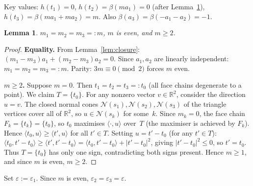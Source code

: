 \documentclass{article}
\newtheorem{lemma}{Lemma}
\begin{document}
Key values:
$h(t_1)=0$, $h(t_2)=\beta(m a_1)=0$ (after Lemma~\ref{lem:n3m}),
$h(t_3)=\beta(ma_1+ma_2)=m$.
Also $\beta(a_3)=\beta(-a_1-a_2)=-1$.

\begin{lemma}\label{lem:n3m}
$m_1=m_2=m_3=:m$, $m$ is even, and $m\ge 2$.
\end{lemma}
\begin{proof}
\textbf{Equality.}
From Lemma~\ref{lem:closure}: $(m_1-m_3)a_1+(m_2-m_3)a_2=0$.
Since $a_1,a_2$ are linearly independent: $m_1=m_2=m_3=:m$.
Parity: $3m\equiv 0\pmod 2$ forces $m$ even.

\textbf{$m\ge 2$.}
Suppose $m=0$.  Then $t_1=t_2=t_3=:t_0$ (all face chains degenerate to a point).
We claim $T=\{t_0\}$.
For any nonzero vector $v\in\mathbb{R}^2$, consider the direction $u=v$.
The closed normal cones $\mathcal{N}(s_1),\mathcal{N}(s_2),\mathcal{N}(s_3)$ of the triangle
vertices cover all of $\mathbb{R}^2$, so $u\in\mathcal{N}(s_k)$ for some~$k$.
Since $m_k=0$, the face chain $F_k=\{t_k\}=\{t_0\}$, so $t_0$ maximises
$\langle\cdot,u\rangle$ over~$T$ (the maximiser is achieved by $F_k$).
Hence $\langle t_0,u\rangle\ge\langle t',u\rangle$ for all $t'\in T$.
Setting $u=t'-t_0$ (for any $t'\in T$):
$\langle t_0,t'-t_0\rangle\ge\langle t',t'-t_0\rangle=\langle t_0,t'-t_0\rangle+|t'-t_0|^2$,
giving $|t'-t_0|^2\le 0$, so $t'=t_0$.
Thus $T=\{t_0\}$ has only one sign, contradicting both signs present.
Hence $m\ge 1$, and since $m$ is even, $m\ge 2$.
\end{proof}

Set $\varepsilon:=\varepsilon_1$.  Since $m$ is even, $\varepsilon_2=\varepsilon_3=\varepsilon$.
\end{document}
